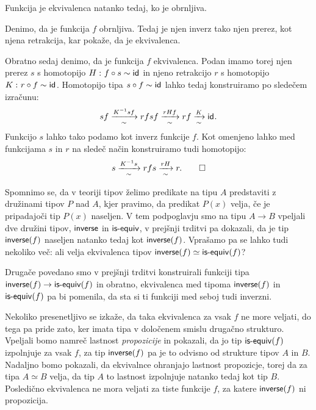 \begin{trditev}
  \label{inv-of-equiv}
  Funkcija je ekvivalenca natanko tedaj, ko je obrnljiva.
\end{trditev}

\begin{dokaz}
  Denimo, da je funkcija \(f\) obrnljiva. Tedaj je njen inverz tako njen prerez, kot njena retrakcija, kar pokaže, da je ekvivalenca.

  Obratno sedaj denimo, da je funkcija \(f\) ekvivalenca. Podan imamo torej njen prerez
  \(s\) s homotopijo \(H \,\colon f \circ s \sim \textnormal{\textsf{id}}_{}\) in njeno retrakcijo \(r\) s homotopijo
  \(K \,\colon r \circ f \sim \textnormal{\textsf{id}}_{}\). Homotopijo tipa \(s \circ f \sim \textnormal{\textsf{id}}_{}\) lahko tedaj konstruiramo
  po sledečem izračunu:
  \[s f \xrightarrow[\sim]{K^{-1}sf} r f s f \xrightarrow[\sim]{rHf} r f \xrightarrow[\sim]{K} \textnormal{\textsf{id}}_{}.\]
  Funkcijo \(s\) lahko tako podamo kot inverz funkcije \(f\).
  Kot omenjeno lahko med funkcijama \(s\) in \(r\) na sledeč način konstruiramo tudi homotopijo:
  \[s \xrightarrow[\sim]{K^{-1}s} rfs \xrightarrow[\sim]{rH} r. \qedhere\]
\end{dokaz}

Spomnimo se, da v teoriji tipov želimo predikate na tipu \(A\) predstaviti z družinami tipov \(P\) nad \(A\), kjer pravimo, da predikat \(P(x)\) velja, če je pripadajoči tip \(P(x)\) naseljen. V tem podpoglavju smo na tipu \(A \to B\) vpeljali dve družini tipov, \(\textnormal{\textsf{inverse}}\) in \(\textnormal{\textsf{is-equiv}}\), v prejšnji trditvi pa dokazali, da je tip \(\textnormal{\textsf{inverse}}(f)\) naseljen natanko tedaj kot \(\textnormal{\textsf{inverse}}(f)\). Vprašamo pa se lahko tudi nekoliko več: ali velja ekvivalenca tipov \(\textnormal{\textsf{inverse}}(f) \simeq \textnormal{\textsf{is-equiv}}(f)\)?

Drugače povedano smo v prejšnji trditvi konstruirali funkciji tipa \(\textnormal{\textsf{inverse}}(f) \to \textnormal{\textsf{is-equiv}}(f)\) in obratno, ekvivalenca med tipoma \(\textnormal{\textsf{inverse}}(f)\) in \(\textnormal{\textsf{is-equiv}}(f)\) pa bi pomenila, da sta si ti funkciji med seboj tudi inverzni.

Nekoliko presenetljivo se izkaže, da taka ekvivalenca za vsak \(f\) ne more veljati, do tega pa pride zato, ker imata tipa v določenem smislu drugačno strukturo. Vpeljali bomo namreč lastnost \emph{propozicije} in pokazali, da jo tip \(\textnormal{\textsf{is-equiv}}(f)\) izpolnjuje za vsak \(f\), za tip \(\textnormal{\textsf{inverse}}(f)\) pa je to odvisno od strukture tipov \(A\) in \(B\). Nadaljno bomo pokazali, da ekvivalnce ohranjajo lastnost propozicje, torej da za tipa \(A \simeq B\) velja, da tip \(A\) to lastnost izpolnjuje natanko tedaj kot tip \(B\). Posledično ekvivalenca ne mora veljati za tiste funkcije \(f\), za katere \(\textnormal{\textsf{inverse}}(f)\) ni propozicija.

